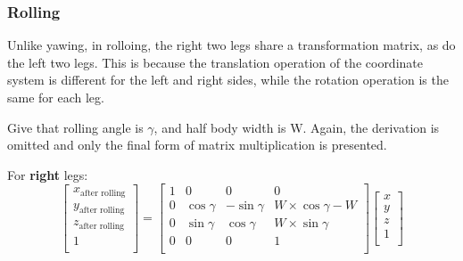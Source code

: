 \subsubsection{Rolling}

Unlike yawing, in rolloing, the right two legs share a transformation matrix, as do the left two legs. This is because the translation operation of the coordinate system is different for the left and right sides, while the rotation operation is the same for each leg.


Give that rolling angle is $\gamma$, and half body width is W. Again, the derivation is omitted and only the final form of matrix multiplication is presented.

For \textbf{right} legs:
\begin{equation}
   \begin{bmatrix}
   x_\text{after rolling} \\
   y_\text{after rolling} \\
   z_\text{after rolling} \\
   1                      \\
   \end{bmatrix}
   =
   \begin{bmatrix}
   1 & 0 & 0 & 0 \\
   0 & \cos\gamma & -\sin\gamma & W \times \cos\gamma - W \\
   0 & \sin\gamma & \cos\gamma & W \times \sin\gamma \\
   0 & 0 & 0 & 1 \\
   \end{bmatrix}
   \begin{bmatrix}
   x \\
   y \\
   z \\
   1 \\
   \end{bmatrix}
\end{equation}


